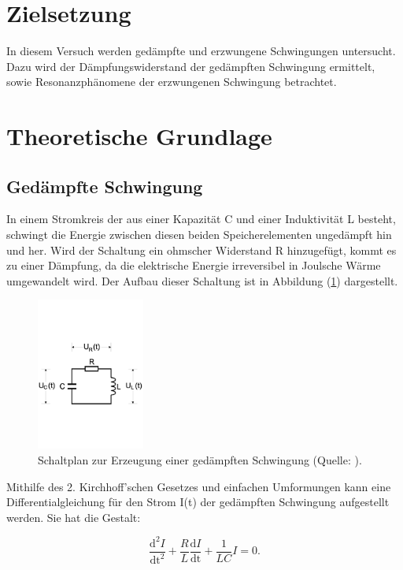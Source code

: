 \section{Zielsetzung}
In diesem Versuch werden gedämpfte und erzwungene Schwingungen untersucht.
Dazu wird der Dämpfungswiderstand der gedämpften Schwingung ermittelt,
sowie Resonanzphänomene der erzwungenen Schwingung betrachtet.

\section{Theoretische Grundlage}

\subsection{Gedämpfte Schwingung}
\noindent
In einem Stromkreis der aus einer Kapazität C und einer Induktivität L besteht, 
schwingt die Energie zwischen diesen beiden Speicherelementen ungedämpft hin und her.
Wird der Schaltung ein ohmscher Widerstand R hinzugefügt,
kommt es zu einer Dämpfung, 
da die elektrische Energie irreversibel in Joulsche Wärme umgewandelt wird.
Der Aufbau dieser Schaltung ist in Abbildung (\ref{fig:gedaempft}) dargestellt.

\begin{figure}
    \centering
       \includegraphics[height=5cm]{gedaempft.pdf}
       \caption{Schaltplan zur Erzeugung einer gedämpften Schwingung (Quelle: \cite{V354}).}
       \label{fig:gedaempft}
\end{figure}

\noindent
Mithilfe des 2. Kirchhoff'schen Gesetzes und einfachen Umformungen kann eine Differentialgleichung für den Strom I(t) der gedämpften Schwingung aufgestellt werden.
Sie hat die Gestalt:

\begin{equation}
\frac{\text{d}^2 I}{\text{dt}^2} + \frac{R}{L} \frac{\text{d} I}{\text{dt}} + \frac{1}{LC}I = 0.
\label{eqn:dgl}
\end{equation}


